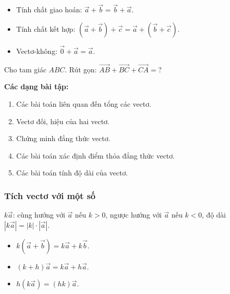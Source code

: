 \documentclass[12pt,a4paper]{article}
\begin{document}
\begin{tinhchat}
  \begin{itemize}
    \item Tính chất giao hoán: $\vec a + \vec b = \vec b + \vec a$.
    \item Tính chất kết hợp: $(\vec a + \vec b) + \vec c = \vec a + (\vec b + \vec c)$.
    \item Vectơ-không: $\vec{0} + \vec a = \vec a$.
  \end{itemize}
\end{tinhchat}

\begin{vidu}
  Cho tam giác $ABC$. Rút gọn: $\overrightarrow{AB} + \overrightarrow{BC} + \overrightarrow{CA} = ?$
\end{vidu}

\medskip\noindent\textbf{Các dạng bài tập:}
\begin{enumerate}[label=\textbf{Dạng \arabic*:}, leftmargin=*, align=left]
  \item Các bài toán liên quan đến tổng các vectơ.
  \item Vectơ đối, hiệu của hai vectơ.
  \item Chứng minh đẳng thức vectơ.
  \item Các bài toán xác định điểm thỏa đẳng thức vectơ.
  \item Các bài toán tính độ dài của vectơ.
\end{enumerate}

\subsubsection{Tích vectơ với một số}

\begin{dinhnghia}
  $k\vec a$: cùng hướng với $\vec a$ nếu $k > 0$, ngược hướng với $\vec a$ nếu $k < 0$, độ dài $|k\vec a| = |k| \cdot |\vec a|$.
\end{dinhnghia}

\begin{tinhchat}
  \begin{itemize}
    \item $k(\vec a + \vec b) = k\vec a + k\vec b$.
    \item $(k + h)\vec a = k\vec a + h\vec a$.
    \item $h(k\vec a) = (hk)\vec a$.
  \end{itemize}
\end{tinhchat}
\end{document}
